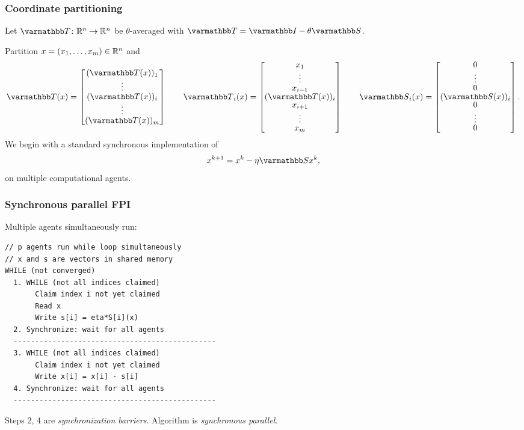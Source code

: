 \documentclass[10pt,mathserif]{beamer}
\begin{document}
\begin{frame}[fragile]
\frametitle{Coordinate partitioning}
Let $\opT\colon\reals^n\rightarrow\reals^n$ be $\theta$-averaged with $\opT=\opI-\theta\opS$.

Partition $x= (x_1,\dots,x_m)\in \mathbb{R}^n$ and 
\[
\opT(x)=\begin{bmatrix}
(\opT(x))_1\\
\vdots\\
(\opT(x))_i\\
\vdots\\
(\opT(x))_m
\end{bmatrix}
\qquad
\begingroup
\renewcommand*{\arraystretch}{.8}
\opT_i(x)=\begin{bmatrix}
x_1\\
\vdots\\
x_{i-1}\\
(\opT(x))_i\\
x_{i+1}\\
\vdots\\
x_m
\end{bmatrix}
\endgroup
\qquad
\opS _i(x)=
\begin{bmatrix}
0\\
\vdots\\
0\\
(\opS (x))_i\\
0\\
\vdots\\
0
\end{bmatrix}.
\]
We begin with a standard synchronous implementation of
\begin{align*}
  x^{k+1} = x^k - \eta \opS x^k,
\end{align*}
on multiple computational agents.

\end{frame}

\begin{frame}
\frametitle{Synchronous parallel FPI}
Multiple agents simultaneously run:
\begin{lstlisting}
// p agents run while loop simultaneously
// x and s are vectors in shared memory
WHILE (not converged)
  1. WHILE (not all indices claimed)
       Claim index i not yet claimed
       Read x
       Write s[i] = eta*S[i](x)
  2. Synchronize: wait for all agents
  -----------------------------------------------
  3. WHILE (not all indices claimed)
       Claim index i not yet claimed
       Write x[i] = x[i] - s[i]
  4. Synchronize: wait for all agents
  -----------------------------------------------
\end{lstlisting}
Steps 2, 4 are \emph{synchronization barriers}. Algorithm is \emph{synchronous parallel}.
\end{frame}
\end{document}
